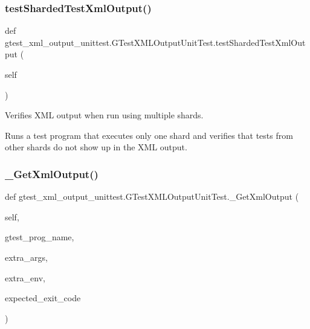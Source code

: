 \subsubsection{\texorpdfstring{test\+Sharded\+Test\+Xml\+Output()}{testShardedTestXmlOutput()}}
{\footnotesize\ttfamily def gtest\+\_\+xml\+\_\+output\+\_\+unittest.\+G\+Test\+X\+M\+L\+Output\+Unit\+Test.\+test\+Sharded\+Test\+Xml\+Output (\begin{DoxyParamCaption}\item[{}]{self }\end{DoxyParamCaption})}

\begin{DoxyVerb}Verifies XML output when run using multiple shards.

Runs a test program that executes only one shard and verifies that tests
from other shards do not show up in the XML output.
\end{DoxyVerb}
 \mbox{\label{classgtest__xml__output__unittest_1_1_g_test_x_m_l_output_unit_test_ae57479fcca1861b35c9bcd26d08a18f4}} 
\subsubsection{\texorpdfstring{\+\_\+\+Get\+Xml\+Output()}{\_GetXmlOutput()}}
{\footnotesize\ttfamily def gtest\+\_\+xml\+\_\+output\+\_\+unittest.\+G\+Test\+X\+M\+L\+Output\+Unit\+Test.\+\_\+\+Get\+Xml\+Output (\begin{DoxyParamCaption}\item[{}]{self,  }\item[{}]{gtest\+\_\+prog\+\_\+name,  }\item[{}]{extra\+\_\+args,  }\item[{}]{extra\+\_\+env,  }\item[{}]{expected\+\_\+exit\+\_\+code }\end{DoxyParamCaption})\hspace{0.3cm}{\ttfamily [private]}}

